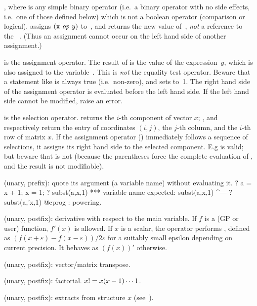 %
, where  is any simple binary operator
(i.e.~a binary operator with no side effects, i.e.~one of those defined below)
which is not a boolean operator (comparison or logical).
 assigns $({\tt x}~\hbox{\it op\/}~y)$ to~,
and returns the new value of~, \emph{not} a reference to the
~. (Thus an assignment cannot occur on the left hand
side of another assignment.)

%
\kbd{=} is the assignment operator. The result of  is the value
of the expression~$y$, which is also assigned to the variable~. This
is \emph{not} the equality test operator. Beware that a statement like
 is always true (i.e.~non-zero), and sets  to~1.
The right hand side of the assignment operator is evaluated before the left
hand side. If the left hand side cannot be modified, raise an error.

\kbd{[ ]} is the selection operator.  returns the $i$-th
component of vector $x$; ,  and
 respectively return the entry of coordinates $(i,j)$, the
$j$-th column, and the $i$-th row of matrix $x$. If the assignment operator
(\kbd{=}) immediately follows a sequence of selections, it assigns its
right hand side to the selected component. E.g  is valid;
but beware that  is not (because the parentheses force
the complete evaluation of , and the result is not modifiable).

%
 (unary, prefix): quote its argument (a variable name) without
evaluating it.
\bprog
? a = x + 1; x = 1;
? subst(a,x,1)
  ***   variable name expected: subst(a,x,1)
                                        ^---
? subst(a,'x,1)
@eprog
%
\kbd{\pow}: powering.

 (unary, postfix): derivative with respect to the main variable. If
$f$ is a (GP or user) function, $f'(x)$ is allowed. If $x$ is a scalar, the
operator performs , defined as $(f(x+\varepsilon) -
f(x-\varepsilon)) / 2\varepsilon$ for a suitably small epsilon depending on
current precision. It behaves as $(f(x))'$ otherwise.

\strut\kbd{\til} (unary, postfix): vector/matrix transpose.

\kbd{!} (unary, postfix): factorial. $x{\tt !}=x(x-1)\cdots 1$.

 (unary, postfix):  extracts
 from structure $x$ (see~).

